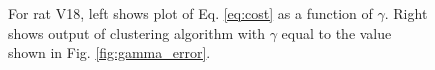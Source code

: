 \documentclass[superscriptaddress, twocolumn, prl]{revtex4}
\begin{document}
\begin{figure}
\centering
{}
\caption{For rat V18, left shows plot of Eq. \ref{eq:cost} as a function of $\gamma$. Right shows output of clustering algorithm with $\gamma$ equal to the value shown in Fig. \ref{fig:gamma_error}.}
\end{figure}
\end{document}
